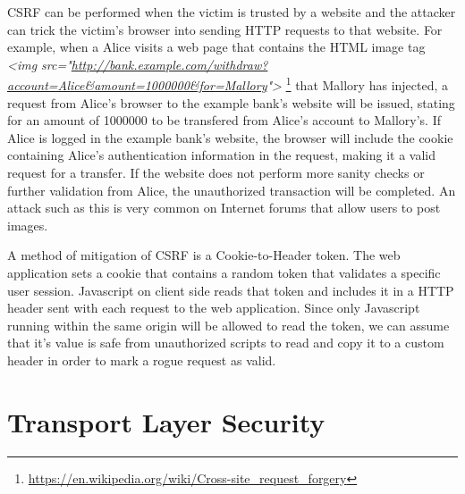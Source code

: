 CSRF can be performed when the victim is trusted by a website and the attacker can trick the victim's browser into sending HTTP requests to that website. For example, when a Alice visits a web page that contains the HTML image tag \textit{<img src="\url{http://bank.example.com/withdraw?account=Alice&amount=1000000&for=Mallory}">} \footnote{\url{https://en.wikipedia.org/wiki/Cross-site_request_forgery}} that Mallory has injected, a request from Alice's browser to the example bank's website will be issued, stating for an amount of 1000000 to be transfered from Alice's account to Mallory's. If Alice is logged in the example bank's website, the browser will include the cookie containing Alice's authentication information in the request, making it a valid request for a transfer. If the website does not perform more sanity checks or further validation from Alice, the unauthorized transaction will be completed. An attack such as this is very common on Internet forums that allow users to post images.

A method of mitigation of CSRF is a Cookie-to-Header token. The web application sets a cookie that contains a random token that validates a specific user session. Javascript on client side reads that token and includes it in a HTTP header sent with each request to the web application. Since only Javascript running within the same origin will be allowed to read the token, we can assume that it's value is safe from unauthorized scripts to read and copy it to a custom header in order to mark a rogue request as valid.

\section{Transport Layer Security}\label{sec:tls}
